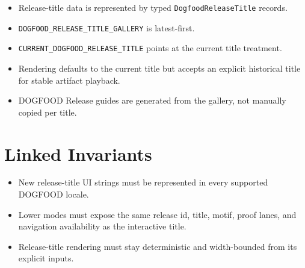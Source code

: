 \begin{itemize}
\tightlist
\item
  Release-title data is represented by typed \texttt{D\allowbreak{}o\allowbreak{}g\allowbreak{}f\allowbreak{}o\allowbreak{}o\allowbreak{}d\allowbreak{}R\allowbreak{}e\allowbreak{}l\allowbreak{}e\allowbreak{}a\allowbreak{}s\allowbreak{}e\allowbreak{}T\allowbreak{}i\allowbreak{}t\allowbreak{}l\allowbreak{}e} records.
\item
  \texttt{D\allowbreak{}O\allowbreak{}G\allowbreak{}F\allowbreak{}O\allowbreak{}O\allowbreak{}D\allowbreak{}\_\allowbreak{}R\allowbreak{}E\allowbreak{}L\allowbreak{}E\allowbreak{}A\allowbreak{}S\allowbreak{}E\allowbreak{}\_\allowbreak{}T\allowbreak{}I\allowbreak{}T\allowbreak{}L\allowbreak{}E\allowbreak{}\_\allowbreak{}G\allowbreak{}A\allowbreak{}L\allowbreak{}L\allowbreak{}E\allowbreak{}R\allowbreak{}Y} is latest-first.
\item
  \texttt{C\allowbreak{}U\allowbreak{}R\allowbreak{}R\allowbreak{}E\allowbreak{}N\allowbreak{}T\allowbreak{}\_\allowbreak{}D\allowbreak{}O\allowbreak{}G\allowbreak{}F\allowbreak{}O\allowbreak{}O\allowbreak{}D\allowbreak{}\_\allowbreak{}R\allowbreak{}E\allowbreak{}L\allowbreak{}E\allowbreak{}A\allowbreak{}S\allowbreak{}E\allowbreak{}\_\allowbreak{}T\allowbreak{}I\allowbreak{}T\allowbreak{}L\allowbreak{}E} points at the current title treatment.
\item
  Rendering defaults to the current title but accepts an explicit historical title for stable artifact playback.
\item
  DOGFOOD Release guides are generated from the gallery, not manually copied per title.
\end{itemize}

\section{Linked Invariants}\label{record-112-linked-invariants}

\begin{itemize}
\tightlist
\item
  New release-title UI strings must be represented in every supported DOGFOOD locale.
\item
  Lower modes must expose the same release id, title, motif, proof lanes, and navigation availability as the interactive title.
\item
  Release-title rendering must stay deterministic and width-bounded from its explicit inputs.
\end{itemize}

